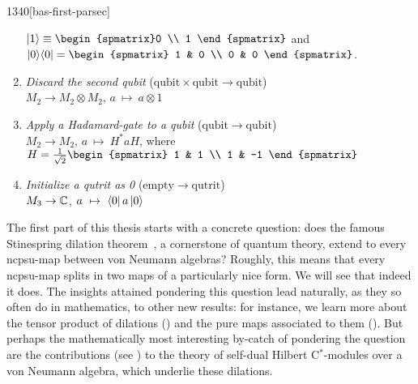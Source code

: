\begin{parsec}{1340}[bas-first-parsec]
\begin{point}{10}
\begin{point}{20}
\begin{enumerate}
{            $\ket{1}\equiv\begin{spmatrix}0 \\ 1 \end{spmatrix}$ and
                $\ketbra{0}{0} = \begin{spmatrix} 1 & 0
                \\ 0 & 0 \end{spmatrix}$.}
\item
    \emph{Discard the second qubit} \quad
            ($\mathrm{qubit} \times \mathrm{qubit}\to \mathrm{qubit}$) \\
        $M_2 \rightarrow M_2 \otimes M_2$, \quad
        $a \ \mapsto \ a \otimes 1$
\item
    \emph{Apply a Hadamard-gate to a qubit} \quad
            ($\mathrm{qubit} \to \mathrm{qubit}$) \\
        $M_2 \rightarrow M_2$, \quad
        $a \ \mapsto \ H^*a H $, \quad where~$H = \frac{1}{\sqrt{2}}\begin{spmatrix}
            1 & 1 \\ 1 & -1
        \end{spmatrix}$
\item
    \emph{Initialize a qutrit as 0} \quad
            ($\mathrm{empty} \to \mathrm{qutrit}$) \\
        $M_3 \rightarrow \mathbb{C}$, \quad
        $a \ \mapsto \ \bra{0}a\ket{0}$
\end{enumerate}
\end{point}
\begin{point}{30}%
The first part of this thesis starts with a concrete question:
    does the famous  Stinespring dilation theorem~\cite{stinespring},
    a cornerstone of quantum theory,
    extend to every ncpsu-map between von Neumann algebras?
Roughly, this means that every ncpsu-map  splits
    in two maps of a particularly nice form.
We will see that indeed it does.
The insights attained pondering this question lead naturally,
        as they so often do in mathematics, to other new results:
    for instance, we learn more about  the tensor product of
    dilations ()
        and the pure maps associated to them ().
But perhaps the mathematically
    most interesting by-catch of pondering the question
    are the contributions (see ) to the theory
    of self-dual Hilbert C$^*$-modules over a von Neumann algebra,
    which underlie these dilations.
\end{point}
\begin{point}{40}%

\end{point}
\end{point}
\end{parsec}
